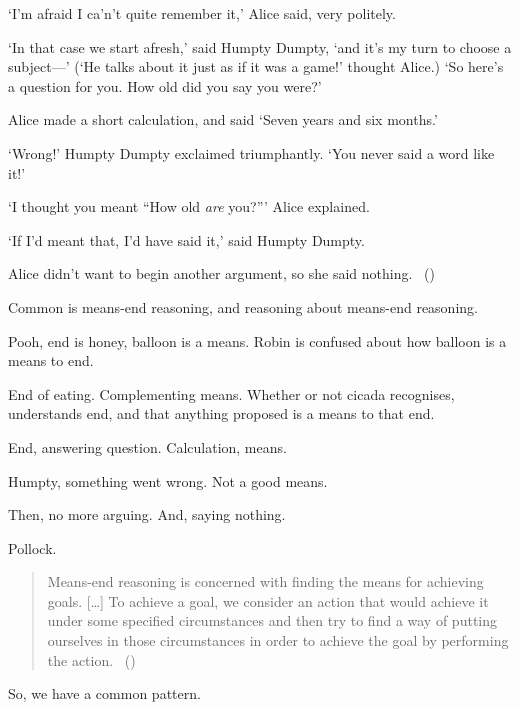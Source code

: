 \begin{note}
  \begin{scenario}
    `I'm afraid I ca'n't quite remember it,'
    Alice said, very politely.

    \noindent%
    `In that case we start afresh,'
    said Humpty Dumpty,
    `and it's my turn to choose a subject---'
    (`He talks about it just as if it was a game!' thought Alice.)
    `So here's a question for you. How old did you say you were?'

    \noindent%
    Alice made a short calculation, and said
    `Seven years and six months.'

    \noindent%
    `Wrong!'
    Humpty Dumpty exclaimed triumphantly.
    `You never said a word like it!'

    \noindent%
    `I thought you meant ``How old \emph{are} you?'''
    Alice explained.

    \noindent%
    `If I'd meant that, I'd have said it,'
    said Humpty Dumpty.

    \noindent%
    Alice didn't want to begin another argument, so she said nothing.\newline
    \mbox{ }\hfill\mbox{(\cite[188]{Carroll:2009aa})}
  \end{scenario}
\end{note}

\begin{note}
  Common is means-end reasoning, and reasoning about means-end reasoning.

  Pooh, end is honey, balloon is a means.
  Robin is confused about how balloon is a means to end.

  End of eating.
  Complementing means.
  Whether or not cicada recognises, understands end, and that anything proposed is a means to that end.

  End, answering question.
  Calculation, means.

  Humpty, something went wrong.
  Not a good means.

  Then, no more arguing.
  And, saying nothing.
\end{note}

\begin{note}
  Pollock.

  \begin{quote}
    Means-end reasoning is concerned with finding the means for achieving goals.
    [\dots]
    To achieve a goal, we consider an action that would achieve it under some specified circumstances and then try to find a way of putting ourselves in those circumstances in order to achieve the goal by performing the action.%
    \mbox{ }\hfill\mbox{(\cite[60]{Pollock:2002aa})}
  \end{quote}

  So, we have a common pattern.
\end{note}


